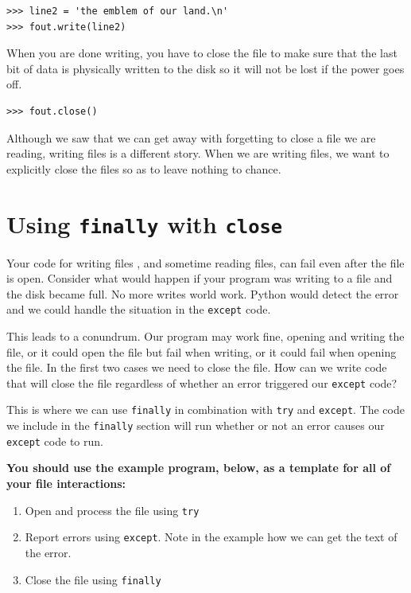 \beforeverb
\begin{verbatim}
>>> line2 = 'the emblem of our land.\n'
>>> fout.write(line2)
\end{verbatim}
\afterverb
%
When you are done writing, you have to close the file
to make sure that the last bit of data is physically written
to the disk so it will not be lost if the power goes off.

\beforeverb
\begin{verbatim}
>>> fout.close()
\end{verbatim}
\afterverb
%
Although we saw that we can get away with forgetting to close a file we are reading, writing files is a different story. When we are writing files, 
we want to explicitly close the files so as to leave nothing
to chance.


\section{Using \texttt{finally} with \texttt{close}}

Your code for writing files , and sometime reading files, can fail even after the file is open. Consider what would happen if your program was writing to a file and the disk became full. No more writes world work. Python would detect the error and we could handle the situation in the \texttt{except} code.

This leads to a conundrum. Our program may work fine, opening and writing the file, or it could open the file but fail when writing, or it could fail when opening the file. In the first two cases we need to close the file. How can we write code that will close the file regardless of whether an error triggered our \texttt{except} code?

This is where we can use \texttt{finally} in combination with \texttt{try} and \texttt{except}. The code we include in the \texttt{finally} section will run whether or not an error causes our \texttt{except} code to run.

\textbf{You should use the example program, below, as a template for all of your file
interactions:}
\begin{enumerate}
	\item Open and process the file using \texttt{try} 
	\item Report errors using \texttt{except}. Note in the example how we can get the text of the error.
	\item Close the file using \texttt{finally}
\end{enumerate}

